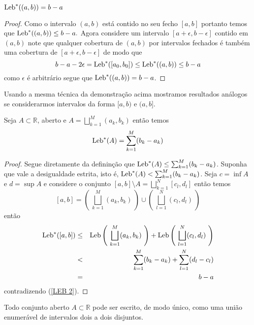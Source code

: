 \begin{lema}

$\textnormal{Leb}^{*}((a,b))=b-a$
\end{lema}


\begin{proof}
Como o intervalo $(a,b)$ está contido no seu 
fecho $[a,b]$ portanto temos que  $\textnormal{Leb}^{*}((a,b))\leq b-a.$ 
Agora considere um intervalo $[a+\epsilon,b-\epsilon]$ 
contido em $(a,b)$ note que qualquer cobertura de 
$(a,b)$ por intervalos fechados é também uma cobertura 
de $[a+\epsilon,b-\epsilon]$ de modo que 
$$
b-a-2\epsilon= \textnormal{Leb}^{*}([a_0,b_0])\leq  \textnormal{Leb}^{*}((a,b))\leq b-a
$$
como $\epsilon$ é arbitrário segue que  $\textnormal{Leb}^{*}((a,b))=b-a$.
\end{proof}
Usando a mesma técnica da demonstração acima mostramos 
resultados análogos se considerarmos intervalos  
da forma $[a,b)$ e $(a,b]$.





\begin{lema}\label{LEB 3}
Seja $A\subset \mathbb{R}$,  aberto e $A=\bigsqcup_{k=1}^M(a_k,b_k)$ então temos 
$$
\textnormal{Leb}^{*}(A)=\sum_{k=1}^M(b_k-a_k)
$$
\end{lema}

\begin{proof}
Segue diretamente da defininção que 
$\textnormal{Leb}^{*}(A)\leq\sum_{k=1}^M(b_k-a_k)$. 
Suponha que vale a desigualdade estrita, 
isto é, $\textnormal{Leb}^{*}(A)<\sum_{k=1}^M(b_k-a_k)$. 
Seja $c=\inf A$ e $d=\sup A$
e considere o conjunto $[a,b]\setminus A=\bigsqcup_{k=1}^{N}[c_l,d_l]$ 
então temos
$$
[a,b]=\left(~\bigsqcup_{k=1}^M(a_k,b_k)~\right)
\cup \left(~\bigsqcup_{l=1}^{N}(c_l,d_l)~\right)
$$
então 
\begin{eqnarray*}
\textnormal{Leb}^{*}([a,b])
&\leq &
\textnormal{Leb}\left(~\bigsqcup_{k=1}^M(a_k,b_k)~\right)
+\textnormal{Leb}\left(~\bigsqcup_{l=1}^{N}(c_l,d_l)~\right)
\\
&
<
&
\sum_{k=1}^{M} (b_k-a_k)+\sum_{l=1}^N(d_l-c_l)
\\
&
=
&
b-a
\end{eqnarray*}
contradizendo (\ref{LEB 2}).

\end{proof}



\begin{proposicao}
Todo conjunto aberto $A\subset \mathbb{R}$ pode ser 
escrito, de modo único, como uma união enumerável de 
intervalos dois a dois disjuntos.
\end{proposicao}


